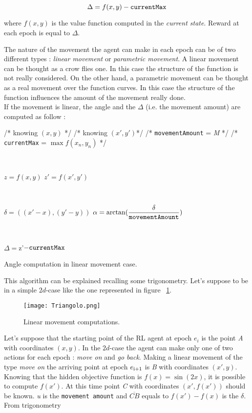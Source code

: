 \begin{itemize}
	\begin{equation}
		\Delta = f(x, y) - {\tt currentMax}
	\end{equation} 
	
	where $f(x, y)$ is the value function computed in the  \textit{current state}. Reward at each epoch is equal to $\Delta$.
	
\end{itemize}

The nature of the movement the agent can make in each epoch can be of two different types : \textit{linear movement} or \textit{parametric movement}. A linear movement can be thought as a crow flies one. In this case the structure of the function is not really considered. On the other hand, a parametric movement can be thought as a real movement over the function curves. In this case the structure of the function influences the amount of the movement really done. \\

If the movement is linear, the angle and the $\Delta$ (i.e. the movement amount) are computed as follow :

\begin{algorithm}
	/* knowing $(x, y)$ */ \;
	/* knowing $(x', y')$*/ \;
	/* {\tt movementAmount} = \textit{M} */ \;
	/* {\tt currentMax} = $\max f(x_n, y_n)$ */ \;
	
	
	\
	
	$z = f(x, y)$ \;
	$z' = f(x', y')$\;
	
	\
	
	$\delta = ((x'-x),  (y'-y))$ \;
	$\alpha = \arctan(\dfrac{\delta}{\tt movementAmount})$
	 
	 \
	 
	 $\Delta = $z'$ - {\tt currentMax} $
	 
	 \caption{Angle computation in linear movement case.} 
	
\end{algorithm}

This algorithm can be explained recalling some trigonometry. Let's suppose to be in a simple $2d$-case like the one represented in figure ~\ref{fig:LMComputations}.

\begin{figure} [h!]
	\centering
	\texttt{[image: Triangolo.png]}
	\caption{Linear movement computations.}
	\label{fig:LMComputations}
\end{figure}

Let's suppose that the starting point of the RL agent at epoch $e_i$ is the point \textit{A} with coordinates $(x, y)$. In the $2d$-case the agent can make only one of two actions for each epoch : \textit{move on} and \textit{go back}. Making a linear movement of the type \textit{move on} the arriving point at epoch $e\textsubscript{i+1}$ is \textit{B} with coordinates $(x', y)$. Knowing that the hidden objective function is $f(x) = \sin(2x)$, it is possible to compute $f(x')$. At this time point \textit{C} with coordinates $(x', f(x'))$ should be known. \textit{u} is the {\tt movement amount} and $\overline{CB}$ equals to $f(x') - f(x)$ is the $\delta$. From trigonometry 

